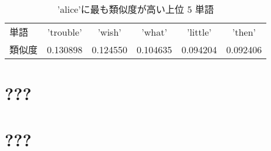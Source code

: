 \documentclass{jarticle}     %
\begin{document}
\begin{table}[h]
  \caption{'alice'に最も類似度が高い上位 5 単語}
  \label{alice}
  \centering
  \begin{tabular}{l|ccccc}
    \hline
    単語       & 'trouble'  & 'wish'     & 'what'     & 'little'   & 'then'     \\
    類似度 & 0.130898 & 0.124550 & 0.104635 & 0.094204 & 0.092406 \\
    \hline
  \end{tabular}
\end{table}




\section{???}


\section{???}




\end{document}
